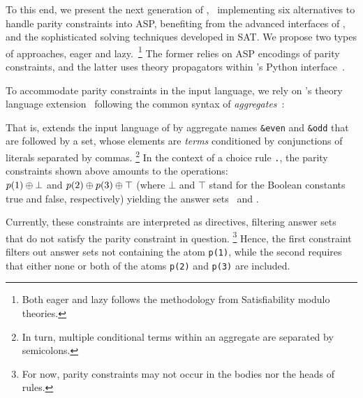 \documentclass[letterpaper]{article} %
\begin{document}
 To this end, we present the next generation of \xorro,~\cite{DBLP:conf/lpnmr/EverardoJKS19}
 implementing six alternatives to handle parity constraints into ASP,
 benefiting from the advanced interfaces of \clingo{},
 and the sophisticated solving techniques developed in SAT.
 We propose two types of approaches, eager and lazy.~\footnote{Both eager and lazy follows the methodology from Satisfiability modulo theories.}
 The former relies on ASP encodings of parity constraints, and the latter uses theory propagators within \clingo{}’s Python interface~\cite{DBLP:conf/iclp/GebserKKOSW16}.
 
 To accommodate parity constraints in the input language,
 we rely on \clingo’s theory language extension~\cite{DBLP:conf/iclp/GebserKKOSW16}
 following the common syntax of \emph{aggregates}~\cite{DBLP:journals/tplp/GebserHKLS15}:
 
 
 That is, \xorro{} extends the input language of \clingo{} by
 aggregate names \texttt{\&even} and \texttt{\&odd} that are followed
 by a set, whose elements are \emph{terms} conditioned by
 conjunctions of literals separated by commas.%
 \footnote{In turn, multiple conditional terms within an aggregate are
 	separated by semicolons.}
 In the context of a choice rule \texttt{.}, the parity constraints shown above
 amounts to the \XOR{} operations: \\
 $p(1) \oplus \bot$ and $p(2) \oplus p(3) \oplus \top$
 (where $\bot$ and $\top$ stand for the Boolean constants true and false, respectively)
 yielding the answer sets~\texttt{} and \texttt{}.
 
 
 Currently, these constraints are interpreted as directives,
 filtering answer sets that do not satisfy the parity constraint in question.
 \footnote{For now, parity constraints may not occur in the bodies nor the heads of rules.}
 Hence, the first
 constraint filters out answer sets not containing the atom
 \texttt{p(1)}, while the second requires that either none or both of
 the atoms \texttt{p(2)} and \texttt{p(3)} are included.
 
\end{document}
